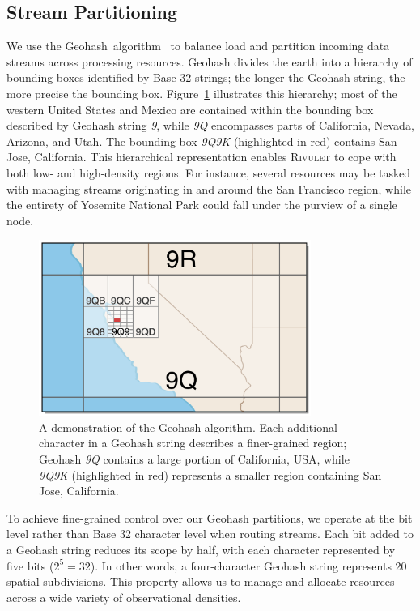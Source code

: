 \subsection{Stream Partitioning}
We use the Geohash~algorithm~\cite{geohash} to balance load and partition incoming data streams across processing resources. Geohash divides the earth into a hierarchy of bounding boxes identified by Base 32 strings; the longer the Geohash string, the more precise the bounding box. Figure~\ref{fig:geohash} illustrates this hierarchy; most of the western United States and Mexico are contained within the bounding box described by Geohash string \emph{9}, while \emph{9Q} encompasses parts of California, Nevada, Arizona, and Utah. The bounding box \emph{9Q9K} (highlighted in red) contains San Jose, California. This hierarchical representation enables \textsc{Rivulet} to cope with both low- and high-density regions. For instance, several resources may be tasked with managing streams originating in and around the San Francisco region, while the entirety of Yosemite National Park could fall under the purview of a single node.

\begin{figure}
    \centerline{\includegraphics[width=3.5in]{figures/geohash.pdf}}
    \caption{A demonstration of the Geohash algorithm. Each additional character in a Geohash string describes a finer-grained region; Geohash \emph{9Q} contains a large portion of California, USA, while \emph{9Q9K} (highlighted in red) represents a smaller region containing San Jose, California.}
    \label{fig:geohash}
\end{figure}

To achieve fine-grained control over our Geohash partitions, we operate at the bit level rather than Base 32 character level when routing streams. Each bit added to a Geohash string reduces its scope by half, with each character represented by five bits ($2^5 = 32$). In other words, a four-character Geohash string represents 20 spatial subdivisions. This property allows us to manage and allocate resources across a wide variety of observational densities.

